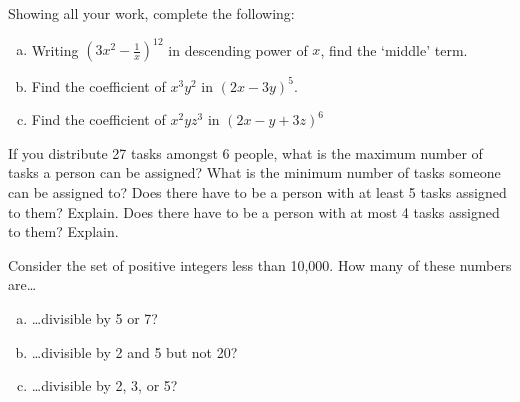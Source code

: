 \documentclass[11pt,letterpaper]{article}
\begin{document}

 Showing all your work, complete the following:
	\begin{enumerate}[(a)]
	\item Writing $\left(3x^2 - \frac{1}{x} \right)^{12}$ in descending power of $x$, find the `middle' term. 
	\item Find the coefficient of $x^3y^2$ in $(2x - 3y)^5$.
	\item Find the coefficient of $x^2yz^3$ in $(2x - y + 3z)^6$
	\end{enumerate}



\newpage



 If you distribute 27 tasks amongst 6 people, what is the maximum number of tasks a person can be assigned? What is the minimum number of tasks someone can be assigned to? Does there have to be a person with at least 5 tasks assigned to them? Explain. Does there have to be a person with at most 4 tasks assigned to them? Explain. 



\newpage



 Consider the set of positive integers less than 10,000. How many of these numbers are\dots
	\begin{enumerate}[(a)]
	\item \dots divisible by 5 or 7?
	\item \dots divisible by 2 and 5 but not 20?
	\item \dots divisible by 2, 3, or 5?
	\end{enumerate}
\end{document}
